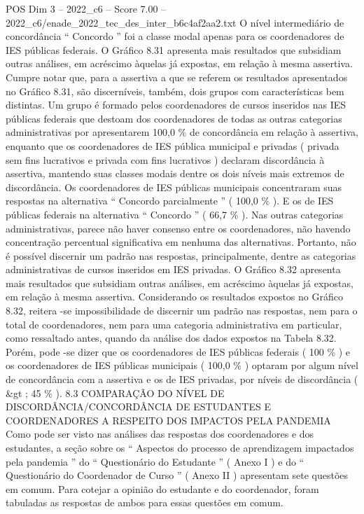 \begin{textsample}{POS Dim 3 – 2022\_c6 – Score 7.00 – 2022\_c6/enade\_2022\_tec\_des\_inter\_b6c4af2aa2.txt}
O nível intermediário de concordância “ Concordo ” foi a classe modal apenas para os coordenadores de IES públicas federais.
O Gráfico 8.31 apresenta mais resultados que subsidiam outras análises, em acréscimo àquelas já expostas, em relação à mesma assertiva.
Cumpre notar que, para a assertiva a que se referem os resultados apresentados no Gráfico 8.31, são discerníveis, também, dois grupos com características bem distintas.
Um grupo é formado pelos coordenadores de cursos inseridos nas IES públicas federais que destoam dos coordenadores de todas as outras categorias administrativas por apresentarem 100,0 \% de concordância em relação à assertiva, enquanto que os coordenadores de IES pública municipal e privadas ( privada sem fins lucrativos e privada com fins lucrativos ) declaram discordância à assertiva, mantendo suas classes modais dentre os dois níveis mais extremos de discordância.
Os coordenadores de IES públicas municipais concentraram suas respostas na alternativa “ Concordo parcialmente ” ( 100,0 \% ).
E os de IES públicas federais na alternativa “ Concordo ” ( 66,7 \% ).
Nas outras categorias administrativas, parece não haver consenso entre os coordenadores, não havendo concentração percentual significativa em nenhuma das alternativas.
Portanto, não é possível discernir um padrão nas respostas, principalmente, dentre as categorias administrativas de cursos inseridos em IES privadas.
O Gráfico 8.32 apresenta mais resultados que subsidiam outras análises, em acréscimo àquelas já expostas, em relação à mesma assertiva.
Considerando os resultados expostos no Gráfico 8.32, reitera -se impossibilidade de discernir um padrão nas respostas, nem para o total de coordenadores, nem para uma categoria administrativa em particular, como ressaltado antes, quando da análise dos dados expostos na Tabela 8.32.
Porém, pode -se dizer que os coordenadores de IES públicas federais ( 100 \% ) e os coordenadores de IES públicas municipais ( 100,0 \% ) optaram por algum nível de concordância com a assertiva e os de IES privadas, por níveis de discordância ( \&gt ; 45 \% ). 8.3 COMPARAÇÃO DO NÍVEL DE DISCORDÂNCIA/CONCORDÂNCIA DE ESTUDANTES E COORDENADORES A RESPEITO DOS IMPACTOS PELA PANDEMIA Como pode ser visto nas análises das respostas dos coordenadores e dos estudantes, a seção sobre os “ Aspectos do processo de aprendizagem impactados pela pandemia ” do “ Questionário do Estudante ” ( Anexo I ) e do “ Questionário do Coordenador de Curso ” ( Anexo II ) apresentam sete questões em comum.
Para cotejar a opinião do estudante e do coordenador, foram tabuladas as respostas de ambos para essas questões em comum.

\end{textsample}
